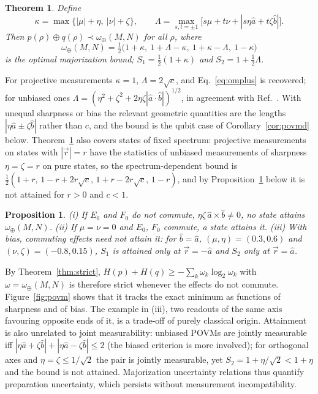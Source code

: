 \documentclass[11pt]{article}
\newtheorem{theorem}{Theorem}
\newtheorem{proposition}{Proposition}
\theoremstyle{definition}
\newcommand{\vecr}{\vec r}
\newcommand{\maj}{\prec}
\newcommand{\omplus}{\omega_{\oplus}}
\newcommand{\sqc}{\sqrt{c}}
\begin{document}
\begin{theorem}\label{thm:povm}
Define
\begin{equation}
  \kappa=\max\{|\mu|+\eta,\ |\nu|+\zeta\},\qquad
  \Lambda=\max_{s,t=\pm1}\bigl[s\mu+t\nu+|s\eta\hat a+t\zeta\hat b|\bigr].
  \label{eq:kappaLambda}
\end{equation}
Then $p(\rho)\oplus q(\rho)\maj\omplus(M,N)$ for all $\rho$, where
\begin{equation}
  \omplus(M,N)=\tfrac12\bigl(1+\kappa,\ 1+\Lambda-\kappa,\ 1+\kappa-\Lambda,\ 1-\kappa\bigr)
  \label{eq:omplusPOVM}
\end{equation}
is the optimal majorization bound; $S_1=\frac12(1+\kappa)$ and $S_2=1+\frac12\Lambda$.
\end{theorem}

For projective measurements $\kappa=1$, $\Lambda=2\sqc$, and Eq.~\eqref{eq:omplus}
is recovered; for unbiased ones $\Lambda=(\eta^2+\zeta^2+2\eta\zeta|\hat a\cdot\hat b|)^{1/2}$,
in agreement with Ref.~. With unequal sharpness or bias the
relevant geometric quantities are the lengths $|\eta\hat a\pm\zeta\hat b|$ rather
than $c$, and the bound is the qubit case of Corollary~\ref{cor:povmd} below.
Theorem~\ref{thm:povm} also covers states of fixed spectrum: projective
measurements on states with $|\vecr|=r$ have the statistics of unbiased
measurements of sharpness $\eta=\zeta=r$ on pure states, so the spectrum-dependent
bound\cite{LiQiao2019,Puchala2018} is
$\frac12(1+r,\,1-r+2r\sqc,\,1+r-2r\sqc,\,1-r)$, and by Proposition~\ref{prop:povmattain}
below it is not attained for $r>0$ and $c<1$.

\begin{proposition}\label{prop:povmattain}
(i) If $E_0$ and $F_0$ do not commute, $\eta\zeta\,\hat a\times\hat b\ne0$, no
state attains $\omplus(M,N)$. (ii) If $\mu=\nu=0$ and $E_0$, $F_0$ commute, a state
attains it. (iii) With bias, commuting effects need not attain it: for
$\hat b=\hat a$, $(\mu,\eta)=(0.3,0.6)$ and $(\nu,\zeta)=(-0.8,0.15)$, $S_1$ is
attained only at $\vecr=-\hat a$ and $S_2$ only at $\vecr=\hat a$.
\end{proposition}

By Theorem~\ref{thm:strict}, $H(p)+H(q)\ge-\sum_k\omega_k\log_2\omega_k$ with
$\omega=\omplus(M,N)$ is therefore strict whenever the effects do not commute.
Figure~\ref{fig:povm} shows that it tracks the exact minimum as functions of
sharpness and of bias. The example in (iii), two readouts of the same axis
favouring opposite ends of it, is a trade-off of purely classical origin.
Attainment is also unrelated to joint measurability: unbiased POVMs are jointly
measurable iff $|\eta\hat a+\zeta\hat b|+|\eta\hat a-\zeta\hat b|\le2$\cite{Busch1986,HMZ2016}
(the biased criterion is more involved\cite{StanoReitznerHeinosaari2008,BuschSchmidt2010,Yu2010});
for orthogonal axes and $\eta=\zeta\le1/\sqrt2$ the pair is jointly measurable,
yet $S_2=1+\eta/\sqrt2<1+\eta$ and the bound is not attained. Majorization
uncertainty relations thus quantify preparation uncertainty, which persists
without measurement incompatibility.
\end{document}
